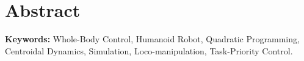 \chapter*{Abstract}


\lipsum[1]  %

\bigskip
\noindent\textbf{Keywords:} Whole-Body Control, Humanoid Robot, Quadratic Programming,
Centroidal Dynamics, Simulation, Loco-manipulation, Task-Priority Control.

\cleardoublepage
